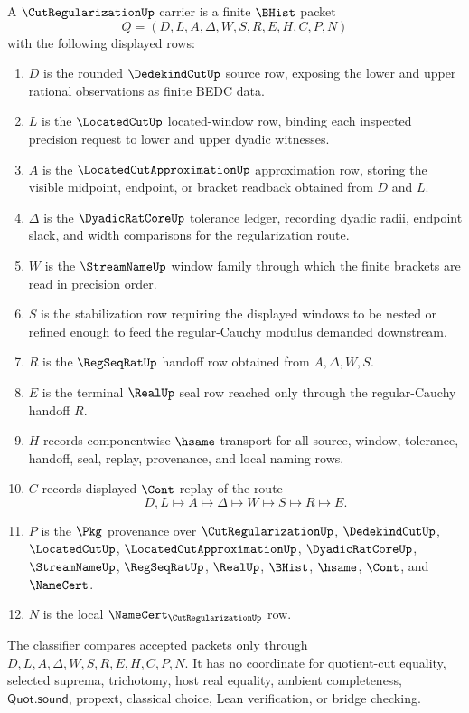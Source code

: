 \begin{definition}
\label{def:cut-regularization-carrier}
A $\CutRegularizationUp$ carrier is a finite $\BHist$ packet
$$
Q=(D,L,A,\Delta,W,S,R,E,H,C,P,N)
$$
with the following displayed rows:
\begin{enumerate}
\item $D$ is the rounded $\DedekindCutUp$ source row, exposing the lower and upper rational observations as finite BEDC data.
\item $L$ is the $\LocatedCutUp$ located-window row, binding each inspected precision request to lower and upper dyadic witnesses.
\item $A$ is the $\LocatedCutApproximationUp$ approximation row, storing the visible midpoint, endpoint, or bracket readback obtained from $D$ and $L$.
\item $\Delta$ is the $\DyadicRatCoreUp$ tolerance ledger, recording dyadic radii, endpoint slack, and width comparisons for the regularization route.
\item $W$ is the $\StreamNameUp$ window family through which the finite brackets are read in precision order.
\item $S$ is the stabilization row requiring the displayed windows to be nested or refined enough to feed the regular-Cauchy modulus demanded downstream.
\item $R$ is the $\RegSeqRatUp$ handoff row obtained from $A,\Delta,W,S$.
\item $E$ is the terminal $\RealUp$ seal row reached only through the regular-Cauchy handoff $R$.
\item $H$ records componentwise $\hsame$ transport for all source, window, tolerance, handoff, seal, replay, provenance, and local naming rows.
\item $C$ records displayed $\Cont$ replay of the route
$$
D,L \longmapsto A \longmapsto \Delta \longmapsto W \longmapsto S \longmapsto R \longmapsto E .
$$
\item $P$ is the $\Pkg$ provenance over $\CutRegularizationUp$, $\DedekindCutUp$, $\LocatedCutUp$, $\LocatedCutApproximationUp$, $\DyadicRatCoreUp$, $\StreamNameUp$, $\RegSeqRatUp$, $\RealUp$, $\BHist$, $\hsame$, $\Cont$, and $\NameCert$.
\item $N$ is the local $\NameCert_{\CutRegularizationUp}$ row.
\end{enumerate}
The classifier compares accepted packets only through $D,L,A,\Delta,W,S,R,E,H,C,P,N$. It has no coordinate for quotient-cut equality, selected suprema, trichotomy, host real equality, ambient completeness, $\mathsf{Quot.sound}$, propext, classical choice, Lean verification, or bridge checking.
\end{definition}

